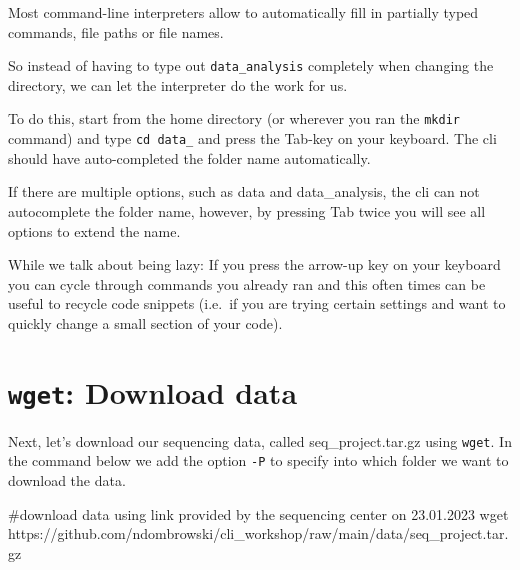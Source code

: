\documentclass[
  letterpaper,
  DIV=11,
  numbers=noendperiod]{scrreprt}
\newenvironment{Shaded}{}{}
\newcommand{\CommentTok}[1]{\textcolor[rgb]{0.42,0.45,0.49}{#1}}
\newcommand{\FunctionTok}[1]{\textcolor[rgb]{0.44,0.26,0.76}{#1}}
\newcommand{\NormalTok}[1]{\textcolor[rgb]{0.14,0.16,0.18}{#1}}
\begin{document}
\begin{tcolorbox}[enhanced jigsaw, breakable, left=2mm, title=\textcolor{quarto-callout-tip-color}{\faLightbulb}\hspace{0.5em}{Tip: Command-line completion}, opacityback=0, opacitybacktitle=0.6, rightrule=.15mm, bottomrule=.15mm, colback=white, colframe=quarto-callout-tip-color-frame, coltitle=black, bottomtitle=1mm, arc=.35mm, toprule=.15mm, colbacktitle=quarto-callout-tip-color!10!white, toptitle=1mm, titlerule=0mm, leftrule=.75mm]

Most command-line interpreters allow to automatically fill in partially
typed commands, file paths or file names.

So instead of having to type out \texttt{data\_analysis} completely when
changing the directory, we can let the interpreter do the work for us.

To do this, start from the home directory (or wherever you ran the
\texttt{mkdir} command) and type \texttt{cd\ data\_} and press the
Tab-key on your keyboard. The cli should have auto-completed the folder
name automatically.

If there are multiple options, such as data and data\_analysis, the cli
can not autocomplete the folder name, however, by pressing Tab twice you
will see all options to extend the name.

While we talk about being lazy: If you press the arrow-up key on your
keyboard you can cycle through commands you already ran and this often
times can be useful to recycle code snippets (i.e.~if you are trying
certain settings and want to quickly change a small section of your
code).

\end{tcolorbox}

\section{\texorpdfstring{\texttt{wget}: Download
data}{wget: Download data}}\label{wget-download-data}

Next, let's download our sequencing data, called seq\_project.tar.gz
using \texttt{wget}. In the command below we add the option \texttt{-P}
to specify into which folder we want to download the data.

\begin{Shaded}
\begin{Highlighting}[]
\CommentTok{\#download data using link provided by the sequencing center on 23.01.2023}
\FunctionTok{wget}\NormalTok{ https://github.com/ndombrowski/cli\_workshop/raw/main/data/seq\_project.tar.gz}
\end{Highlighting}
\end{Shaded}
\end{document}
